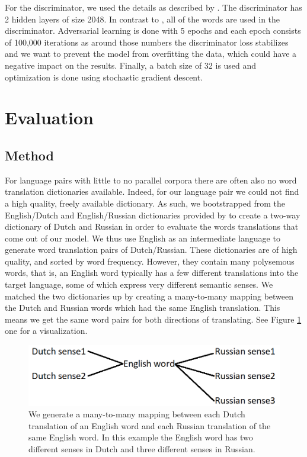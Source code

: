 \documentclass{article}
\begin{document}
For the discriminator, we used the details as described by \citet{conneau2017word}. The discriminator has 2 hidden layers of size 2048. In contrast to \citet{conneau2017word}, all of the words are used in the discriminator. Adversarial learning is done with 5 epochs and each epoch consists of 100,000 iterations as around those numbers the discriminator loss stabilizes and we want to prevent the model from overfitting the data, which could have a negative impact on the results. Finally, a batch size of 32 is used and optimization is done using stochastic gradient descent. 


\section{Evaluation}
\subsection{Method}
For language pairs with little to no parallel corpora there are often also no word translation dictionaries available. Indeed, for our language pair we could not find a high quality, freely available dictionary. As such, we bootstrapped from the English/Dutch and English/Russian dictionaries provided by \citet{conneau2017word} to create a two-way dictionary of Dutch and Russian in order to evaluate the words translations that come out of our model. We thus use English as an intermediate language to generate word translation pairs of Dutch/Russian. These dictionaries are of high quality, and sorted by word frequency. However, they contain many polysemous words, that is, an English word typically has a few different translations into the target language, some of which express very different semantic senses. We matched the two dictionaries up by creating a many-to-many mapping between the Dutch and Russian words which had the same English translation. This means we get the same word pairs for both directions of translating. See Figure \ref{many_mapping} one for a visualization.

\begin{figure}
\centering
\includegraphics[scale=0.4]{many_mapping.png}
\caption{We generate a many-to-many mapping between each Dutch translation of an English word and each Russian translation of the same English word. In this example the English word has two different senses in Dutch and three different senses in Russian.}
\label{many_mapping}
\end{figure}
\end{document}
